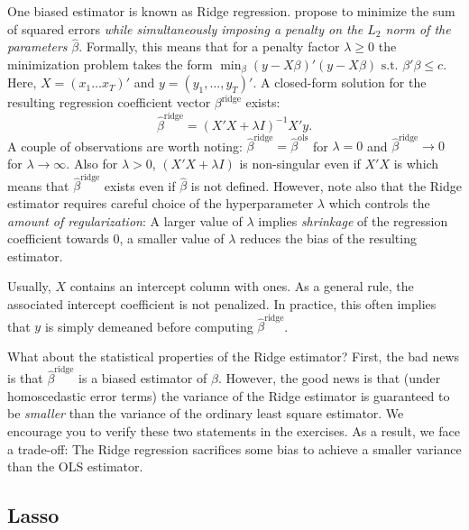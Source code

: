 \documentclass[
]{book}
\begin{document}
One biased estimator is known as Ridge regression. \citet{Hoerl1970} propose to minimize the sum of squared errors \emph{while simultaneously imposing a penalty on the \(L_2\) norm of the parameters} \(\hat\beta\). Formally, this means that for a penalty factor \(\lambda\geq 0\) the minimization problem takes the form \(\min_\beta \left(y - X\beta\right)'\left(y - X\beta\right)\text{ s.t. } \beta'\beta \leq c\). Here, \(X = \left(x_1 \ldots x_T\right)'\) and \(y = \left(y_1, \ldots, y_T\right)'\). A closed-form solution for the resulting regression coefficient vector \(\beta^\text{ridge}\) exists: \[\hat{\beta}^\text{ridge} = \left(X'X + \lambda I\right)^{-1}X'y.\] A couple of observations are worth noting: \(\hat\beta^\text{ridge} = \hat\beta^\text{ols}\) for \(\lambda = 0\) and \(\hat\beta^\text{ridge} \rightarrow 0\) for \(\lambda\rightarrow \infty\). Also for \(\lambda > 0\), \(\left(X'X + \lambda I\right)\) is non-singular even if \(X'X\) is which means that \(\hat\beta^\text{ridge}\) exists even if \(\hat\beta\) is not defined. However, note also that the Ridge estimator requires careful choice of the hyperparameter \(\lambda\) which controls the \emph{amount of regularization}: A larger value of \(\lambda\) implies \emph{shrinkage} of the regression coefficient towards 0, a smaller value of \(\lambda\) reduces the bias of the resulting estimator.

Usually, \(X\) contains an intercept column with ones. As a general rule, the associated intercept coefficient is not penalized. In practice, this often implies that \(y\) is simply demeaned before computing \(\hat\beta^\text{ridge}\).

What about the statistical properties of the Ridge estimator? First, the bad news is that \(\hat\beta^\text{ridge}\) is a biased estimator of \(\beta\). However, the good news is that (under homoscedastic error terms) the variance of the Ridge estimator is guaranteed to be \emph{smaller} than the variance of the ordinary least square estimator. We encourage you to verify these two statements in the exercises. As a result, we face a trade-off: The Ridge regression sacrifices some bias to achieve a smaller variance than the OLS estimator.

\hypertarget{lasso}{%
\subsection{Lasso}\label{lasso}}
\end{document}
